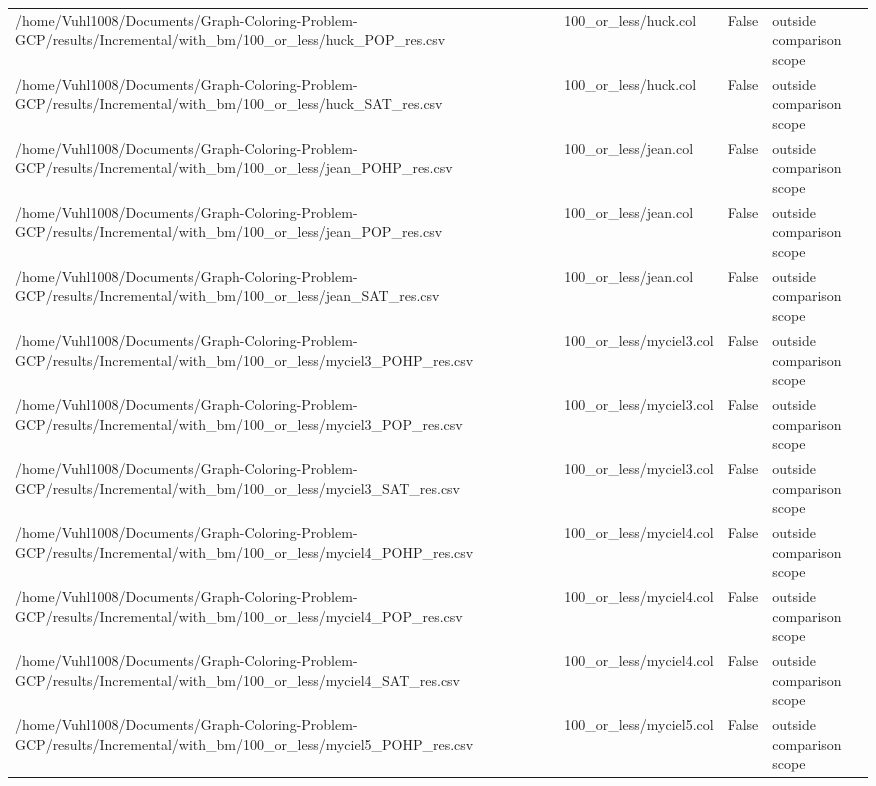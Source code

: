 \begin{table}[htbp]
\begin{tabular}{llll}
/home/Vuhl1008/Documents/Graph-Coloring-Problem-GCP/results/Incremental/with\_bm/100\_or\_less/huck\_POP\_res.csv & 100\_or\_less/huck.col & False & outside comparison scope \\
/home/Vuhl1008/Documents/Graph-Coloring-Problem-GCP/results/Incremental/with\_bm/100\_or\_less/huck\_SAT\_res.csv & 100\_or\_less/huck.col & False & outside comparison scope \\
/home/Vuhl1008/Documents/Graph-Coloring-Problem-GCP/results/Incremental/with\_bm/100\_or\_less/jean\_POHP\_res.csv & 100\_or\_less/jean.col & False & outside comparison scope \\
/home/Vuhl1008/Documents/Graph-Coloring-Problem-GCP/results/Incremental/with\_bm/100\_or\_less/jean\_POP\_res.csv & 100\_or\_less/jean.col & False & outside comparison scope \\
/home/Vuhl1008/Documents/Graph-Coloring-Problem-GCP/results/Incremental/with\_bm/100\_or\_less/jean\_SAT\_res.csv & 100\_or\_less/jean.col & False & outside comparison scope \\
/home/Vuhl1008/Documents/Graph-Coloring-Problem-GCP/results/Incremental/with\_bm/100\_or\_less/myciel3\_POHP\_res.csv & 100\_or\_less/myciel3.col & False & outside comparison scope \\
/home/Vuhl1008/Documents/Graph-Coloring-Problem-GCP/results/Incremental/with\_bm/100\_or\_less/myciel3\_POP\_res.csv & 100\_or\_less/myciel3.col & False & outside comparison scope \\
/home/Vuhl1008/Documents/Graph-Coloring-Problem-GCP/results/Incremental/with\_bm/100\_or\_less/myciel3\_SAT\_res.csv & 100\_or\_less/myciel3.col & False & outside comparison scope \\
/home/Vuhl1008/Documents/Graph-Coloring-Problem-GCP/results/Incremental/with\_bm/100\_or\_less/myciel4\_POHP\_res.csv & 100\_or\_less/myciel4.col & False & outside comparison scope \\
/home/Vuhl1008/Documents/Graph-Coloring-Problem-GCP/results/Incremental/with\_bm/100\_or\_less/myciel4\_POP\_res.csv & 100\_or\_less/myciel4.col & False & outside comparison scope \\
/home/Vuhl1008/Documents/Graph-Coloring-Problem-GCP/results/Incremental/with\_bm/100\_or\_less/myciel4\_SAT\_res.csv & 100\_or\_less/myciel4.col & False & outside comparison scope \\
/home/Vuhl1008/Documents/Graph-Coloring-Problem-GCP/results/Incremental/with\_bm/100\_or\_less/myciel5\_POHP\_res.csv & 100\_or\_less/myciel5.col & False & outside comparison scope \\

\end{tabular}
\end{table}
